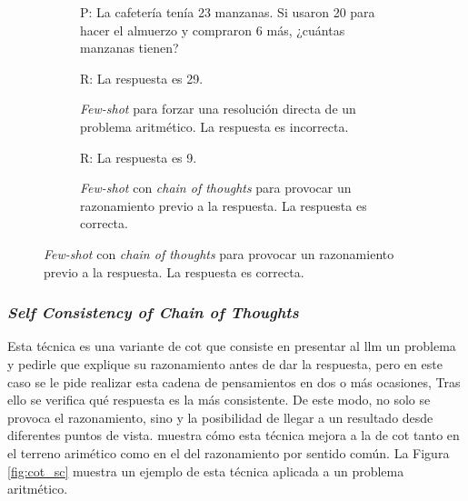 \begin{figure}[H]
\begin{subfigure}{.48\textwidth}
\begin{mdframed}
        P: La cafetería tenía 23 manzanas. Si usaron 20 para hacer el almuerzo y compraron 6 más, ¿cuántas manzanas tienen?
        \vspace{0.2cm}
      \end{mdframed}
    \end{subfigure}

    \vspace{0.2cm}

    \begin{subfigure}{.48\textwidth}
        \centering
        \begin{mdframed}
        R: La respuesta es 29.
        \end{mdframed}
        \caption{\textit{Few-shot} para forzar una resolución directa de un problema aritmético. La respuesta es incorrecta.}
      \end{subfigure}\hfill
    \begin{subfigure}{.48\textwidth}
      \centering
      \begin{mdframed}
        R:  La respuesta es 9.
      \end{mdframed}
      \caption{\textit{Few-shot} con \textit{chain of thoughts} para provocar un razonamiento previo a la respuesta. La respuesta es correcta.}
    \end{subfigure}

    \label{fig:chain_of_thoughts}
\end{figure}

\subsubsection{\textit{Self Consistency of Chain of Thoughts}}

Esta técnica es una variante de \gls{cot} que consiste en presentar al \gls{llm} un problema y pedirle que explique su razonamiento antes de dar la respuesta, pero en este caso se le pide realizar esta cadena de pensamientos en dos o más ocasiones, Tras ello se verifica qué respuesta es la más consistente. De este modo, no solo se provoca el razonamiento, sino y la posibilidad de llegar a un resultado desde diferentes puntos de vista. \cite{wangSelfConsistencyImprovesChain2023} muestra cómo esta técnica mejora a la de \gls{cot} tanto en el terreno arimético como en el del razonamiento por sentido común. La Figura \ref{fig:cot_sc} muestra un ejemplo de esta técnica aplicada a un problema aritmético.

